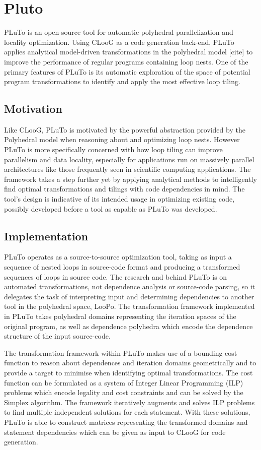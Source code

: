 \documentclass[a4paper,12pt,twoside]{report}
\begin{document}
\section{Pluto}
PLuTo is an open-source tool for automatic polyhedral parallelization and locality optimization. Using CLooG as a code generation
back-end, PLuTo applies analytical model-driven transformations in the polyhedral model [cite] to improve the performance
of regular programs containing loop nests. One of the primary features of PLuTo is its automatic exploration of the space
of potential program transformations to identify and apply the most effective loop tiling.

\subsection*{Motivation}
Like CLooG, PLuTo is motivated by the powerful abstraction provided by the Polyhedral model when reasoning about and optimizing loop
nests. However PLuTo is more specifically concerned with how loop tiling can improve parallelism and data locality, especially
for applications run on massively parallel architectures like those frequently seen in scientific computing applications. The framework
takes a step further yet by applying analytical methods to intelligently find optimal transformations and tilings with code dependencies in mind.
The tool's design is indicative of its intended usage in optimizing existing code, possibly developed before a tool as capable as PLuTo was developed.

\subsection*{Implementation}
PLuTo operates as a source-to-source optimization tool, taking as input a sequence of nested loops in source-code format
and producing a transformed sequences of loops in source code. The research and behind PLuTo is on automated transformations,
not dependence analysis or source-code parsing, so it delegates the task of interpreting input and determining dependencies
to another tool in the polyhedral space, LooPo. The transformation framework implemented in PLuTo takes polyhedral domains representing the iteration
spaces of the original program, as well as dependence polyhedra which encode the dependence structure of the input source-code.

The transformation framework within PLuTo makes use of a bounding cost function to reason about dependences and iteration domains
geometrically and to provide a target to minimise when identifying optimal transformations. The cost function can be formulated
as a system of Integer Linear Programming (ILP) problems which encode legality and cost constraints and can be solved by the Simplex
algorithm. The framework iteratively augments and solves ILP problems to find multiple independent solutions for each statement. With
these solutions, PLuTo is able to construct matrices representing the transformed domains and statement dependencies which can be
given as input to CLooG for code generation.
\end{document}
